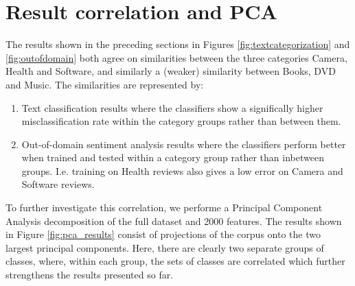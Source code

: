 \section{Result correlation and PCA}
The results shown in the preceding sections in Figures \ref{fig:textcategorization} and \ref{fig:outofdomain} both agree on similarities between the three categories Camera, Health and Software, and similarly a (weaker) similarity between Books, DVD and Music. The similarities are represented by:
\begin{enumerate}
  \item Text classification results where the classifiers show a significally higher misclassification rate within the category groups rather than between them.
  \item Out-of-domain sentiment analysis results where the classifiers perform better when trained and tested within a category group rather than inbetween groups. I.e. training on Health reviews also gives a low error on Camera and Software reviews.
\end{enumerate}

To further investigate this correlation, we performe a Principal Component Analysis decomposition of the full dataset and 2000 features. The results shown in Figure \ref{fig:pca_results} consist of projections of the corpus onto the two largest principal components. Here, there are clearly two separate groups of classes, where, within each group, the sets of classes are correlated which further strengthens the results presented so far.


